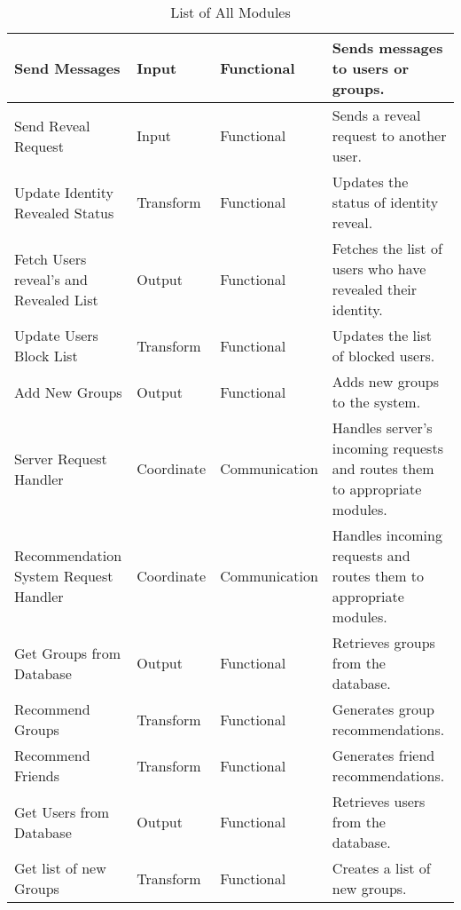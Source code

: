 \documentclass[12pt,a4paper]{article}
\begin{document}
\begin{table}[H]
    \hspace{-1.6cm}
    \renewcommand{\arraystretch}{1.25}
    \begin{tabular}{|p{4cm}|p{2cm}|p{3cm}|p{6cm}|}
    \hline
        Send Messages & Input & Functional & Sends messages to users or groups. \\
        \hline
        Send Reveal Request & Input & Functional & Sends a reveal request to another user. \\
        \hline
        Update Identity Revealed Status & Transform & Functional & Updates the status of identity reveal. \\
        \hline
        Fetch Users reveal's and Revealed List & Output & Functional & Fetches the list of users who have revealed their identity. \\
        \hline
        Update Users Block List & Transform & Functional & Updates the list of blocked users. \\
        \hline
        Add New Groups & Output & Functional & Adds new groups to the system. \\
        \hline
        Server Request Handler & Coordinate & Communication & Handles server's incoming requests and routes them to appropriate modules. \\
        \hline
        Recommendation System Request Handler & Coordinate & Communication & Handles incoming requests and routes them to appropriate modules. \\
        \hline
        Get Groups from Database & Output & Functional & Retrieves groups from the database. \\
        \hline
        Recommend Groups & Transform & Functional & Generates group recommendations. \\
        \hline
        Recommend Friends & Transform & Functional & Generates friend recommendations. \\
        \hline
        Get Users from Database & Output & Functional & Retrieves users from the database. \\
        \hline
        Get list of new Groups & Transform & Functional & Creates a list of new groups. \\
        \hline
    \end{tabular}
    \caption{List of All Modules}
\end{table}
\end{document}
